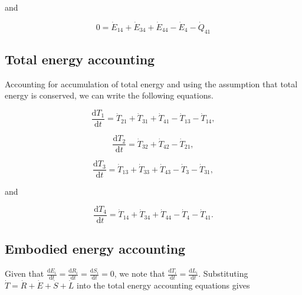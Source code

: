 \documentclass[authoryear,preprint,review,12pt]{elsarticle}
\begin{document}
\noindent and 

\begin{equation} \label{eq:D-CV_E_dot_4_SS}
	0 = \dot{E}_{14} + \dot{E}_{34} + \dot{E}_{44} - \dot{E}_4 - \dot{Q}_{41}
\end{equation}


\subsection{Total energy accounting}

Accounting for accumulation of total energy and using the assumption that total energy is conserved, we can write the following equations.

\begin{equation} \label{eq:D-CV_T_1}
	\frac{\mathrm{d}T_{1}}{\mathrm{d}t} 	 = \dot{T}_{21} + \dot{T}_{31} + \dot{T}_{41} - \dot{T}_{13} - \dot{T}_{14},
\end{equation}

\begin{equation} \label{eq:D-CV_T_2}
	\frac{\mathrm{d}T_{2}}{\mathrm{d}t} 	 = \dot{T}_{32} + \dot{T}_{42} - \dot{T}_{21},
\end{equation}

\begin{equation} \label{eq:D-CV_T_3}
	\frac{\mathrm{d}T_{3}}{\mathrm{d}t} 	 = \dot{T}_{13} + \dot{T}_{33} + \dot{T}_{43} - \dot{T}_{3} - \dot{T}_{31},
\end{equation}

\noindent and 

\begin{equation} \label{eq:D-CV_T_4}
	\frac{\mathrm{d}T_{4}}{\mathrm{d}t} 	 = \dot{T}_{14} + \dot{T}_{34} + \dot{T}_{44} - \dot{T}_{4} - \dot{T}_{41}.
\end{equation}


\subsection{Embodied energy accounting}

Given that $\frac{\mathrm{d}E_{i}}{\mathrm{d}t} = \frac{\mathrm{d}R_{i}}{\mathrm{d}t} = \frac{\mathrm{d}S_{i}}{\mathrm{d}t} = 0$, we note that $\frac{\mathrm{d}T_i}{\mathrm{d}t} = \frac{\mathrm{d}L_i}{\mathrm{d}t}$. Substituting $\dot{T} = \dot{R} + \dot{E} + \dot{S} + \dot{L}$ into the total energy accounting equations gives
\end{document}
